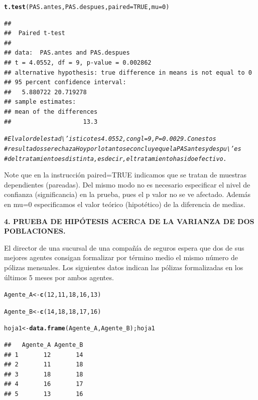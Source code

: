 \documentclass[12pt,letterpaper]{article}\usepackage[]{graphicx}\usepackage[]{color}
\makeatletter
\newcommand{\hlnum}[1]{\textcolor[rgb]{0.686,0.059,0.569}{#1}}%
\newcommand{\hlcom}[1]{\textcolor[rgb]{0.678,0.584,0.686}{\textit{#1}}}%
\newcommand{\hlstd}[1]{\textcolor[rgb]{0.345,0.345,0.345}{#1}}%
\newcommand{\hlkwb}[1]{\textcolor[rgb]{0.69,0.353,0.396}{#1}}%
\newcommand{\hlkwc}[1]{\textcolor[rgb]{0.333,0.667,0.333}{#1}}%
\newcommand{\hlkwd}[1]{\textcolor[rgb]{0.737,0.353,0.396}{\textbf{#1}}}%
\newenvironment{kframe}{%
 \def\at@end@of@kframe{}%
 \ifinner\ifhmode%
  \def\at@end@of@kframe{\end{minipage}}%
  \begin{minipage}{\columnwidth}%
 \fi\fi%
 \def\FrameCommand##1{\hskip\@totalleftmargin \hskip-\fboxsep
 \colorbox{shadecolor}{##1}\hskip-\fboxsep
     \hskip-\linewidth \hskip-\@totalleftmargin \hskip\columnwidth}%
 \MakeFramed {\advance\hsize-\width
   \@totalleftmargin\z@ \linewidth\hsize
   \@setminipage}}%
 {\par\unskip\endMakeFramed%
 \at@end@of@kframe}
\newenvironment{knitrout}{}{} %
\makeatother
\begin{document}
\begin{knitrout}
\begin{kframe}
\begin{alltt}
\hlkwd{t.test}\hlstd{(PAS.antes, PAS.despues,} \hlkwc{paired}\hlstd{=}\hlnum{TRUE}\hlstd{,} \hlkwc{mu}\hlstd{=}\hlnum{0}\hlstd{)}
\end{alltt}
\begin{verbatim}
## 
## 	Paired t-test
## 
## data:  PAS.antes and PAS.despues
## t = 4.0552, df = 9, p-value = 0.002862
## alternative hypothesis: true difference in means is not equal to 0
## 95 percent confidence interval:
##   5.880722 20.719278
## sample estimates:
## mean of the differences 
##                    13.3
\end{verbatim}
\begin{alltt}
\hlcom{# El valor del estad\textbackslash{}'istico t es 4.0552, con gl = 9, P = 0.0029. Con estos }
\hlcom{# resultados se rechaza Ho y por lo tanto se concluye que la PAS antes y despu\textbackslash{}'es }
\hlcom{# del tratamiento es distinta, es decir, el tratamiento ha sido efectivo. }
\end{alltt}
\end{kframe}
\end{knitrout}

Note que en la instrucci\'on paired=TRUE indicamos que se tratan de muestras dependientes 
(pareadas). Del mismo modo no es necesario especificar el nivel de confianza (significancia) en la prueba, pues el p valor no se ve afectado. Adem\'as en mu=0 especificamos el valor te\'orico (hipot\'etico) de la diferencia de medias.\\

\begin{center}
\textbf{4.  PRUEBA DE HIP\'OTESIS ACERCA DE LA VARIANZA DE DOS POBLACIONES.}
\end{center}

El director de una sucursal de una compa\~nía de seguros espera que dos de sus mejores agentes consigan formalizar por t\'ermino medio el mismo número de p\'olizas mensuales. Los siguientes datos indican las p\'olizas formalizadas en los \'ultimos 5 meses por ambos agentes. 

\begin{knitrout}
\color{fgcolor}\begin{kframe}
\begin{alltt}
\hlstd{Agente_A} \hlkwb{<-} \hlkwd{c}\hlstd{(}\hlnum{12}\hlstd{,} \hlnum{11}\hlstd{,} \hlnum{18}\hlstd{,} \hlnum{16}\hlstd{,} \hlnum{13}\hlstd{)}

\hlstd{Agente_B} \hlkwb{<-} \hlkwd{c}\hlstd{(}\hlnum{14}\hlstd{,} \hlnum{18}\hlstd{,} \hlnum{18}\hlstd{,} \hlnum{17}\hlstd{,} \hlnum{16}\hlstd{)}

\hlstd{hoja1} \hlkwb{<-} \hlkwd{data.frame}\hlstd{(Agente_A, Agente_B); hoja1}
\end{alltt}
\begin{verbatim}
##   Agente_A Agente_B
## 1       12       14
## 2       11       18
## 3       18       18
## 4       16       17
## 5       13       16
\end{verbatim}
\end{kframe}
\end{knitrout}
\end{document}
